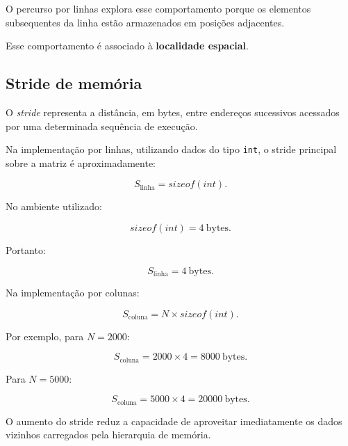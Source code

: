 O percurso por linhas explora esse comportamento porque os elementos
subsequentes da linha estão armazenados em posições adjacentes.

Esse comportamento é associado à \textbf{localidade espacial}.


\subsection{Stride de memória}

O \textit{stride} representa a distância, em bytes, entre endereços
sucessivos acessados por uma determinada sequência de execução.

Na implementação por linhas, utilizando dados do tipo \texttt{int}, o
stride principal sobre a matriz é aproximadamente:

\begin{equation}
    S_{\mathrm{linha}} = sizeof(int).
\end{equation}

No ambiente utilizado:

\begin{equation}
    sizeof(int) = 4\ \text{bytes}.
\end{equation}

Portanto:

\begin{equation}
    S_{\mathrm{linha}} = 4\ \text{bytes}.
\end{equation}

Na implementação por colunas:

\begin{equation}
    S_{\mathrm{coluna}}
    =
    N \times sizeof(int).
    \label{eq:atvd01-stride}
\end{equation}

Por exemplo, para \(N=2000\):

\begin{equation}
    S_{\mathrm{coluna}}
    =
    2000 \times 4
    =
    8000\ \text{bytes}.
\end{equation}

Para \(N=5000\):

\begin{equation}
    S_{\mathrm{coluna}}
    =
    5000 \times 4
    =
    20000\ \text{bytes}.
\end{equation}

O aumento do stride reduz a capacidade de aproveitar imediatamente os
dados vizinhos carregados pela hierarquia de memória.


